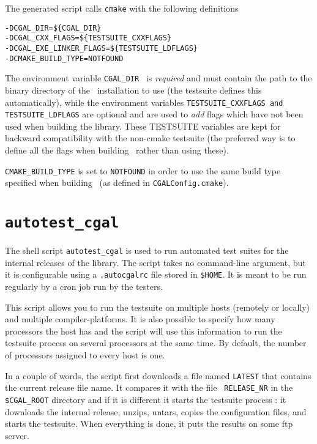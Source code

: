 The generated script calls {\tt cmake} with the following definitions
\begin{verbatim}
-DCGAL_DIR=${CGAL_DIR}
-DCGAL_CXX_FLAGS=${TESTSUITE_CXXFLAGS} 
-DCGAL_EXE_LINKER_FLAGS=${TESTSUITE_LDFLAGS}
-DCMAKE_BUILD_TYPE=NOTFOUND
\end{verbatim}

The environment variable {\tt CGAL\_DIR } is {\em required} and must contain the path
to the binary directory of the \cgal\ installation to use (the testsuite defines 
this automatically), while the environment variables {\tt TESTSUITE\_CXXFLAGS and 
TESTSUITE\_LDFLAGS} are optional and are used to {\em add} flags which have not
been used when building the library. These TESTSUITE variables are
kept for backward compatibility with the non-cmake testsuite (the preferred way is to define all
the flags when building \cgal\ rather than using these).

{\tt CMAKE\_BUILD\_TYPE} is set to {\tt NOTFOUND} in order to use the same
build type specified when building \cgal\ (as defined in {\tt CGALConfig.cmake}).


\section{{\tt autotest\_cgal}}
\label{sec:autotest_cgal}

The shell script {\tt autotest\_cgal} is used to run automated test suites for
the internal releases of the library. The script takes no command-line
argument, but it is configurable using a {\tt .autocgalrc} file stored
in {\tt \$HOME}.
It is meant to be run regularly by a cron job run by the testers.

This script allows you to run the testsuite on multiple hosts (remotely or
locally) and multiple compiler-platforms. It is also possible to specify how
many processors the host has and the script will use this information to run
the testsuite process on several processors at the same time. By default, the
number of processors assigned to every host is one.

In a couple of words, the script first downloads a file named {\tt LATEST}
that contains the current release file name. It compares it with the file {\tt
RELEASE\_NR} in the {\tt \$CGAL\_ROOT} directory and if it is different it
starts the testsuite process : it downloads the internal release, unzips,
untars, copies the configuration files, and starts the testsuite. When
everything is done, it puts the results on some ftp server.

